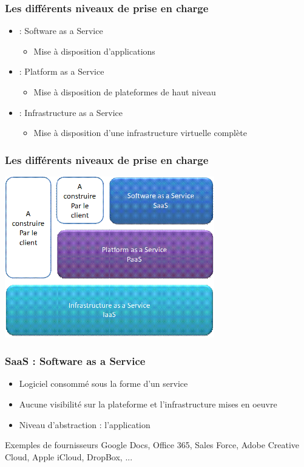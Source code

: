 \begin{frame}
  \frametitle{Les différents niveaux de prise en charge}
  \begin{itemize}
  \item <1>[SaaS] : Software as a Service
  \begin{itemize}
  \item Mise à disposition d'applications
  \end{itemize}
  \item <2>[PaaS] : Platform as a Service
  \begin{itemize}
  \item Mise à disposition de plateformes de haut niveau
  \end{itemize}
  \item <3>[IaaS] : Infrastructure as a Service
  \begin{itemize}
  \item Mise à disposition d'une infrastructure virtuelle complète
  \end{itemize}
  \end{itemize}
\end{frame}

\begin{frame}
  \frametitle{Les différents niveaux de prise en charge \cite{intro-cloud}}
  \includegraphics[height=7cm]{../illustration/niveaux-cloud.png}
\end{frame}

\begin{frame}
\frametitle{SaaS : Software as a Service \cite{wp-saas}}
\begin{itemize}
\item Logiciel consommé sous la forme d’un service
\item Aucune visibilité sur la plateforme et l'infrastructure mises en oeuvre
\item Niveau d'abstraction : l'application
\end{itemize}
\begin{exampleblock}{Exemples de fournisseurs}
Google Docs, Office 365, Sales Force, Adobe Creative Cloud, Apple iCloud, DropBox, ...
\end{exampleblock}
\end{frame}


